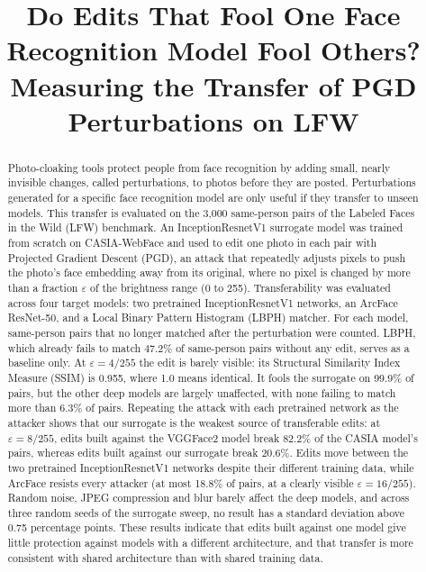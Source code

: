 \documentclass[conference]{IEEEtran}
\begin{document}
\title{Do Edits That Fool One Face Recognition Model Fool Others? Measuring the Transfer of PGD Perturbations on LFW}

\author{
}

\maketitle

\begin{abstract}
Photo-cloaking tools protect people from face recognition by adding small, nearly invisible changes, called perturbations, to photos before they are posted. Perturbations generated for a specific face 
recognition model are only useful if they transfer to unseen models. This transfer is evaluated on the 3,000 same-person pairs of the Labeled Faces in the Wild (LFW) benchmark. An InceptionResnetV1
surrogate model was trained from scratch on CASIA-WebFace and used to edit one photo in each pair with Projected Gradient Descent (PGD), an attack that repeatedly adjusts pixels to push the photo's face embedding away from its
original, where no pixel is changed by more than a fraction $\varepsilon$ of the brightness range (0 to 255). Transferability was evaluated across four target models: two pretrained InceptionResnetV1 networks, an 
ArcFace ResNet-50, and a Local Binary Pattern Histogram (LBPH) matcher. For each model, same-person pairs that no longer matched after the perturbation were counted. LBPH, which already fails to match 47.2\% of same-person pairs without any edit, serves as a baseline only. At $\varepsilon = 4/255$ the edit is barely visible: its Structural Similarity Index Measure
(SSIM) is 0.955, where 1.0 means identical. It fools the surrogate on 99.9\% of pairs, but the other deep models are largely unaffected, with none failing to match more than 6.3\% of pairs. Repeating the attack with each pretrained network as the attacker shows that our surrogate 
is the weakest source of transferable edits: at $\varepsilon = 8/255$, edits built against the VGGFace2 model break 82.2\% of the CASIA model's pairs, whereas edits built against our surrogate break 20.6\%. Edits move between the two 
pretrained InceptionResnetV1 networks despite their different training data, while ArcFace resists every attacker (at most 18.8\% of pairs, at a clearly visible $\varepsilon = 16/255$). Random noise, JPEG compression and blur barely affect the deep models, and across three random seeds of the surrogate sweep, no result has a standard deviation above 0.75 percentage points. These results indicate that edits built against one
model give little protection against models with a different architecture, and that transfer is more consistent with shared architecture than with shared training data.
\end{abstract}
\end{document}
